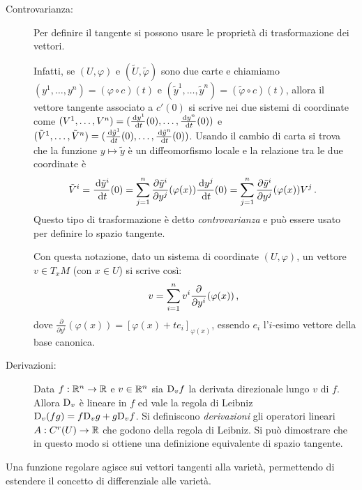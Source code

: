 \begin{description}
 \item [Controvarianza:]
Per definire il tangente si possono usare le proprietà di trasformazione dei vettori.

Infatti, se $(U,\varphi)$ e $(\tilde{U},\tilde{\varphi})$ sono due carte e chiamiamo $(y^1,\dots,y^n)=(\varphi\circ c)(t)$ e $(\tilde{y}^1,\dots,\tilde{y}^n)=(\tilde{\varphi}\circ c)(t)$, allora il vettore tangente associato a $c'(0)$ si scrive nei due sistemi di coordinate come $(V^1,\dots,V^n)=(\frac{\,\mathrm d y^1}{\,\mathrm d t}(0),\dots,\frac{\,\mathrm d y^n}{\,\mathrm d t}(0))$ e $(\tilde{V}^1,\dots,\tilde{V}^n)=(\frac{\,\mathrm d\tilde{y}^1}{\,\mathrm d t}(0),\dots,\frac{\,\mathrm d\tilde{y}^n}{\,\mathrm d t}(0))$.
Usando il cambio di carta si trova che la funzione $y\mapsto\tilde{y}$ è un diffeomorfismo locale e la relazione tra le due coordinate è 
\begin{equation*}
	\tilde{V}^i=\frac{\,\mathrm d\tilde{y}^i}{\,\mathrm d t}(0)=\sum_{j=1}^n\frac{\partial\tilde{y}^i}{\partial y^j}(\varphi(x)) \frac{\,\mathrm d y^j}{\,\mathrm d t}(0)=\sum_{j=1}^n\frac{\partial\tilde{y}^i}{\partial y^j}(\varphi(x))V^j\, \text{. }
\end{equation*}
Questo tipo di trasformazione è detto \emph{controvarianza} e può essere usato per definire lo spazio tangente. 

Con questa notazione, dato un sistema di coordinate $(U,\varphi)$, un vettore $v\in T_x M$ (con $x\in U$) si scrive così:
\begin{equation*}
	v=\sum_{i=1}^nv^i\frac{\partial}{\partial y^i}(\varphi(x))\, \text{, }
\end{equation*}
dove $\frac{\partial}{\partial y^i}(\varphi(x))=[\varphi(x)+te_i]_{\varphi(x)}$, essendo $e_i$ l'$i$-esimo vettore della base canonica.

\item [Derivazioni:] 
Data $f:\mathbb R^n\to\mathbb R$ e $v\in\mathbb R^n$ sia $\mathrm D_vf$ la derivata direzionale lungo $v$ di $f$. Allora $\mathrm D_v$ è lineare in $f$ ed vale la regola di Leibniz $\mathrm D_v(fg)=f\mathrm D_vg+g\mathrm D_vf$. Si definiscono \emph{derivazioni} gli operatori lineari $A:C^r(U)\to\mathbb R$ che godono della regola di Leibniz. Si può dimostrare che in questo modo si ottiene una definizione equivalente di spazio tangente.

\end{description}


Una funzione regolare agisce sui vettori tangenti alla varietà, permettendo di estendere il concetto di differenziale alle varietà.
 
